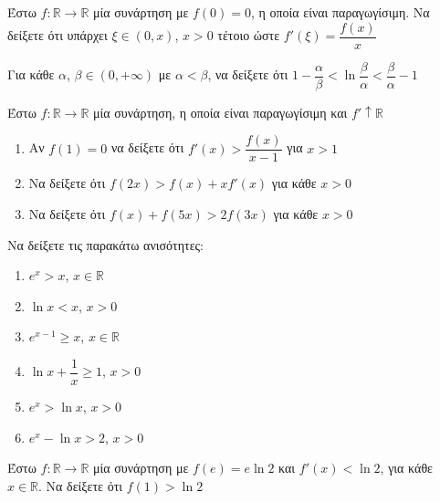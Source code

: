 \documentclass{presentation}
\begin{document}
\begin{askisi}
    Έστω $f:\mathbb{R}\to\mathbb{R}$ μία συνάρτηση με $f(0)=0$, η οποία είναι παραγωγίσιμη. Να δείξετε ότι υπάρχει $ξ\in (0,x)$, $x>0$ τέτοιο ώστε $f'(ξ)=\dfrac{f(x)}{x}$

\end{askisi}

\begin{askisi}
    Για κάθε $α$, $β\in (0,+\infty)$ με $α<β$, να δείξετε ότι $1-\dfrac{α}{β}<\ln \dfrac{β}{α}<\dfrac{β}{α}-1$

\end{askisi}

\begin{askisi}
    Έστω $f:\mathbb{R}\to\mathbb{R}$ μία συνάρτηση, η οποία είναι παραγωγίσιμη και $f'\uparrow \mathbb{R}$
    \begin{enumerate}
        \item<1-> Αν $f(1)=0$ να δείξετε ότι $f'(x)>\dfrac{f(x)}{x-1}$ για $x>1$
        \item<2-> Να δείξετε ότι $f(2x)>f(x)+xf'(x)$ για κάθε $x>0$
        \item<3-> Να δείξετε ότι $f(x)+f(5x)>2f(3x)$ για κάθε $x>0$
    \end{enumerate}

\end{askisi}

\begin{askisi}
    Να δείξετε τις παρακάτω ανισότητες:
    \begin{enumerate}
        \item<1-> $e^x> x$, $x\in\mathbb{R}$
        \item<2-> $\ln x<x$, $x>0$
        \item<3-> $e^{x-1}\ge x$, $x\in\mathbb{R}$
        \item<4-> $\ln x+\dfrac{1}{x}\ge 1$, $x>0$
        \item<5-> $e^x>\ln x$, $x>0$
        \item<6-> $e^x-\ln x>2$, $x>0$
    \end{enumerate}

\end{askisi}

\begin{askisi}
    Έστω $f:\mathbb{R}\to\mathbb{R}$ μία συνάρτηση με $f(e)=e\ln 2$ και $f'(x)<\ln 2$, για κάθε $x\in \mathbb{R}$. Να δείξετε ότι $f(1)>\ln 2$

\end{askisi}
\end{document}
